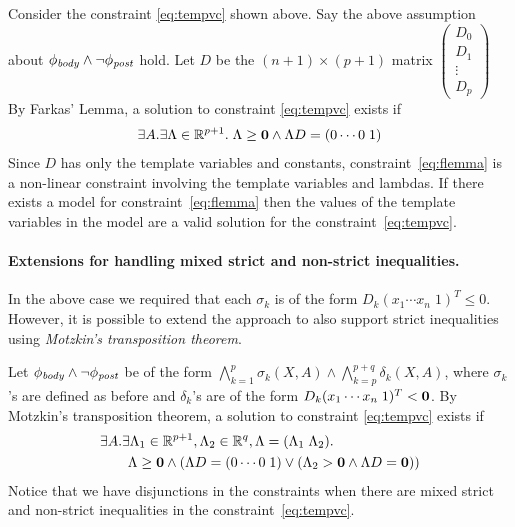 \documentclass[a4paper,10pt]{article}
\begin{document}
Consider the constraint \ref{eq:tempvc} shown above. Say the above assumption about $\mathit{\phi_{body}} \wedge \neg \mathit{\phi_{post}}$ hold. 
Let $D$ be the $(n+1) \times (p+1)$ matrix 
$\left(
\begin{array}{c}
D_0 \\
D_1 \\
\vdots \\
D_p
\end{array}
\right)$
By Farkas' Lemma, a solution to constraint \ref{eq:tempvc} exists if
%
\begin{align}
\exists A. \exists \Lambda \in \mathbb{R}^{p+1}. \; \Lambda \ge \mathbf{0} \wedge \Lambda D =(0 \cdots 0 \; 1) \label{eq:flemma}
\end{align}
%
Since $D$ has only the template variables and constants, constraint~\ref{eq:flemma} is a non-linear constraint involving the template variables and lambdas. If there exists a model for constraint~\ref{eq:flemma} then the values of the template variables in the model are a valid solution for the constraint~\ref{eq:tempvc}.

\paragraph{Extensions for handling mixed strict and non-strict inequalities.}

In the above case we required that each $\sigma_k$ is of the form 
$D_k (x_1 \cdots x_n \; 1)^T \le 0$. However, it is possible to extend the approach to
also support strict inequalities using \emph{Motzkin's transposition theorem}.

Let $\mathit{\phi_{body}} \wedge \neg \mathit{\phi_{post}}$ be of the form 
$\bigwedge \limits_{k=1}^{p} \sigma_k(X,A) \wedge \bigwedge \limits_{k=p}^{p+q} \delta_k(X,A)$,
where $\sigma_k$'s are defined as before and $\delta_k$'s are of the form 
$D_k (x_1 \cdots x_n \; 1)^T < \mathbf{0}$.
By Motzkin's transposition theorem, a solution to constraint \ref{eq:tempvc} exists if
%
\begin{align}
& \nonumber
\exists A. \exists \Lambda_1 \in \mathbb{R}^{p+1}, \Lambda_2 \in \mathbb{R}^{q}, \Lambda = (\Lambda_1 \; \Lambda_2). \; \\ 
& \qquad \Lambda \ge \mathbf{0} \wedge (\Lambda D =(0 \cdots 0 \; 1) \vee (\Lambda_2 > \mathbf{0} \wedge \Lambda D = \mathbf{0})) \label{eq:motlemma}
\end{align}
%
Notice that we have disjunctions in the constraints when there are mixed strict and non-strict inequalities in the constraint~\ref{eq:tempvc}. 
\end{document}
